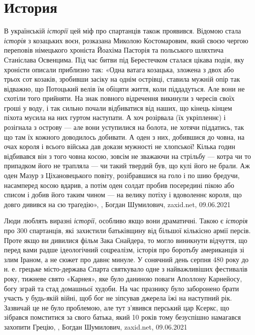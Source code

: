  
 
 
 
 
\chapter{История}

В українській \emph{історії} цей міф про спартанців також проявився. Відомою
стала \emph{історія} з козацьких воєн, розказана Миколою Костомаровим, який
своєю чергою переповів німецького хроніста Йоахіма Пасторія та польського
шляхтича Станіслава Освенцима. Під час битви під Берестечком сталася цікава
подія, яку хроністи описали приблизно так: «Одна ватага козацька, зложена з
двох або трьох сот козаків, зробивши засіку на однім острівці, ставила мужній
опір так відважно, що Потоцький велів їм обіцяти життя, коли піддадуться. Але
вони не схотіли того прийняти. На знак повного відречення викинули з чересів
своїх гроші у воду, і так сильно почали відбиватися від наших, що кінець кінцем
піхота мусила на них гуртом наступати. А хоч розірвала (їх укріпленнє) і
розігнала з острову — але вони уступилися на болота, не хотячи піддатись, так
що там їх кожного доводилось добивати. А оден з них, добившися до човна, на
очах короля і всього війська дав докази мужності не хлопської! Кілька годин
відбивався він з того човна косою, зовсім не зважаючи на стрільбу — котра чи то
припадком його не трапляла — чи такий твердий був, що кулі його не брали. Аж
оден Мазур з Ціхановецького повіту, розібравшися на голо і по шию бредучи,
насамперед косою вдарив, а потім оден солдат пробив посередині пікою або списом
і добив його таким чином — на велику потіху і вдоволеннє короля, що довго
дивився на сю траґедію»,
, Богдан Шумилович, zaxid.net, 09.06.2021

Люди люблять виразні \emph{історії}, особливо якщо вони драматичні. Такою є \emph{історія}
про 300 спартанців, які захистили батьківщину від більшої кількісно армії
персів. Проте якщо ви дивилися фільм Зака Снайдера, то могло виникнути
відчуття, що перед вами радше ідеологічний соцреалізм, історія про боротьбу
американців зі злим Іраном, а не сюжет про давнє минуле.  У сонячний день
серпня 480 року до н. е. грецьке місто-держава Спарта святкувало одне з
найважливіших фестивалів року, тижневе свято «Карнея», яке було даниною поваги
Аполлону Карнейосу, богу зграй та стад домашньої худоби. На час празнику було
заборонено брати участь у будь-якій війні, щоб бог не зіпсував джерела їжі на
наступний рік. Зазвичай це не було проблемою, але тут з'явився перський цар
Ксеркс, що зібрався помститися за свого батька, який 10 років тому безуспішно
намагався захопити Грецію,
, Богдан Шумилович, zaxid.net, 09.06.2021


